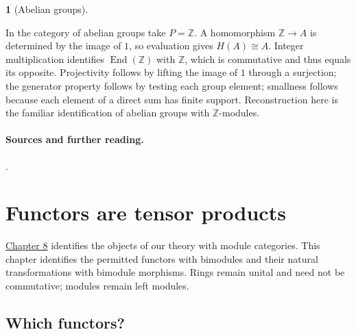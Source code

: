 \documentclass[11pt,a4paper]{article}
\newcommand{\mathheading}{}
\theoremstyle{plain}
\theoremstyle{definition}
\newtheorem*{definitionstatement}{\mathheading}
\newenvironment{mathdefinition}[3]{\renewcommand{\mathheading}{#1 #2}\begin{definitionstatement}[#3]}{\end{definitionstatement}}
\begin{document}
\begin{mathdefinition}{Example}{8.7}{Abelian groups}
\label{env-8-7}

In the category of abelian groups take \(P=\mathbb Z\). A homomorphism \(\mathbb Z\to A\) is determined by the image of \(1\), so evaluation gives \(H(A)\cong A\). Integer multiplication identifies \(\operatorname{End}(\mathbb Z)\) with \(\mathbb Z\), which is commutative and thus equals its opposite. Projectivity follows by lifting the image of \(1\) through a surjection; the generator property follows by testing each group element; smallness follows because each element of a direct sum has finite support. Reconstruction here is the familiar identification of abelian groups with \(\mathbb Z\)-modules.


\par{}\par

\end{mathdefinition}
 
\paragraph{Sources and further reading.}
\cite[\S\S3.5, 3.8 and 3.12]{crawley}.

\section{Functors are tensor products}
\label{chapter-09}
  
\hyperref[chapter-08]{Chapter 8} identifies the objects of our theory with module categories. This chapter identifies the permitted functors with bimodules and their natural transformations with bimodule morphisms. Rings remain unital and need not be commutative; modules remain left modules.

 
\subsection{Which functors?}
\label{hypotheses}
 
\end{document}
